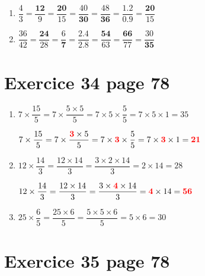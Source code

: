 \documentclass[12pt,a4paper]{article}
\begin{document}
\begin{enumerate}
	\item $\dfrac{4}{3} = \dfrac{\mathbf{12}}{9} = \dfrac{\mathbf{20}}{15} = \dfrac{40}{\mathbf{30}} = \dfrac{48}{\mathbf{36}} = \dfrac{\num{1.2}}{\mathbf{\num{0.9}}} = \dfrac{\mathbf{20}}{15}$
	
	\item $\dfrac{36}{42} = \dfrac{\mathbf{24}}{28} = \dfrac{6}{\mathbf{7}} = \dfrac{\num{2.4}}{\mathbf{\num{2.8}}} = \dfrac{\mathbf{54}}{63} = \dfrac{\mathbf{66}}{77} = \dfrac{30}{\mathbf{35}}$
\end{enumerate}

\section*{Exercice 34 page 78}

\begin{enumerate}
	\item $7 \times \dfrac{15}{5} = 7 \times \dfrac{5 \times 5}{5} = 7 \times 5 \times \dfrac{5}{5} = 7 \times 5  \times 1= 35 $ 
	
	\vspace*{0.35cm}
	
		$7 \times \dfrac{15}{5} = 7 \times \dfrac{\textcolor{red}{\mathbf{3}} \times 5}{5} = 7 \times \textcolor{red}{\mathbf{3}} \times \dfrac{5}{5} = 7 \times \textcolor{red}{\mathbf{3}}  \times 1= \textcolor{red}{\mathbf{21}} $
	
	\vspace*{0.5cm}
	\item $12 \times \dfrac{14}{3} = \dfrac{12 \times 14}{3} = \dfrac{3 \times 2 \times 14}{3} = 2 \times 14 = 28$
	
	
	\vspace*{0.35cm}
	
	 $12 \times \dfrac{14}{3} = \dfrac{12 \times 14}{3} = \dfrac{3 \times \textcolor{red}{\mathbf{4}} \times 14}{3} = \textcolor{red}{\mathbf{4}} \times 14 = \textcolor{red}{\mathbf{56}}$
	
	\vspace*{0.5cm}
	\item $25 \times \dfrac{6}{5} = \dfrac{25 \times 6}{5} = \dfrac{5 \times 5 \times 6}{5} = 5 \times 6 = 30$
\end{enumerate}

\section*{Exercice 35 page 78}
\end{document}

